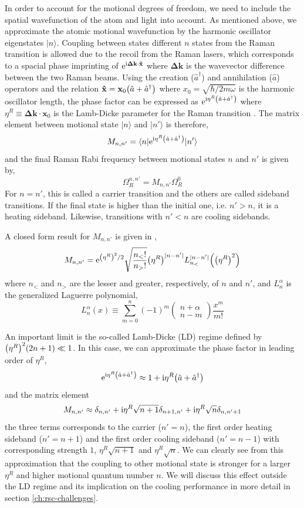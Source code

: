 In order to account for the motional degrees of freedom, we need to include the spatial
wavefunction of the atom and light into account.
As mentioned above, we approximate the atomic motional wavefunction by the harmonic oscillator
eigenstates $|n\rangle$. Coupling between states different $n$ states from the Raman transition
is allowed due to the recoil from the Raman lasers,
which corresponds to a spacial phase imprinting of $\mathrm{e}^{\mathrm{i}\mathbf{\Delta k}\cdot\mathbf{\hat x}}$
where $\mathbf{\Delta k}$ is the wavevector difference between the two Raman beams.
Using the creation ($\hat a^\dagger$) and annihilation ($\hat a$) operators and the relation
$\mathbf{\hat x}=\mathbf{x}_0{\left({\hat a+\hat a^\dagger}\right)}$ where $x_0=\sqrt{\hbar/2m\omega}$
is the harmonic oscillator length, the phase factor can be expressed as
$\mathrm{e}^{\mathrm{i}\eta^R{\left({\hat a+\hat a^\dagger}\right)}}$ where $\eta^R\equiv\mathbf{\Delta k}\cdot\mathbf{x}_0$
is the Lamb-Dicke parameter for the Raman transition \todo{\cite{}}.
The matrix element between motional state $|n\rangle$ and $|n'\rangle$ is therefore,
\[ M_{n,n'}=\langle n|\mathrm{e}^{\mathrm{i}\eta^R{\left({\hat a+\hat a^\dagger}\right)}}|n'\rangle \]
and the final Raman Rabi frequency between motional states $n$ and $n'$ is given by,
\[ \Omega_{R}^{n,n'}=M_{n,n'}\Omega_R^0 \]
For $n=n'$, this is called a carrier transition and the others are called sideband transitions.
If the final state is higher than the initial one, i.e. $n'>n$, it is a heating sideband.
Likewise, transitions with $n'<n$ are cooling sidebands.

A closed form result for $M_{n,n'}$ is given in \todo{\cite{}},
\[ M_{n,n'}=\mathrm{e}^{{\left({\eta^R}\right)}^2/2}\sqrt{\frac{n_<!}{n_>!}}{\left({\eta^R}\right)}^{|n-n'|}L_{n_<}^{|n-n'|}{\left({{\left({\eta^R}\right)}^2}\right)} \]
where $n_<$ and $n_>$ are the lesser and greater, respectively, of $n$ and $n'$,
and $L_n^\alpha$ is the generalized Laguerre polynomial,
\[ L_n^\alpha(x)\equiv\sum_{m=0}^n(-1)^m\begin{pmatrix}n+\alpha\\n-m\end{pmatrix}\frac{x^m}{m!} \]

An important limit is the so-called Lamb-Dicke (LD) regime defined by ${\left({\eta^R}\right)}^2(2n+1)\ll 1$.
In this case, we can approximate the phase factor in leading order of $\eta^R$,
\[ \mathrm{e}^{\mathrm{i}\eta^R{\left({\hat a+\hat a^\dagger}\right)}}\approx1+\mathrm{i}\eta^R{\left({\hat a+\hat a^\dagger}\right)} \]
and the matrix element
\[ M_{n,n'}\approx\delta_{n,n'}+\mathrm{i}\eta^R\sqrt{n+1}\delta_{n+1,n'}+\mathrm{i}\eta^R\sqrt{n}\delta_{n,n'+1} \]
the three terms corresponds to the carrier ($n'=n$),
the first order heating sideband ($n'=n+1$)
and the first order cooling sideband ($n'=n-1$) with corresponding strength
$1$, $\eta^R\sqrt{n+1}$ and $\eta^R\sqrt{n}$.
We can clearly see from this approximation that the coupling to other motional state
is stronger for a larger $\eta^R$ and higher motional quantum number $n$.
We will discuss this effect outside the LD regime and its implication
on the cooling performance in more detail in section \ref{ch:rsc-challenges}.

